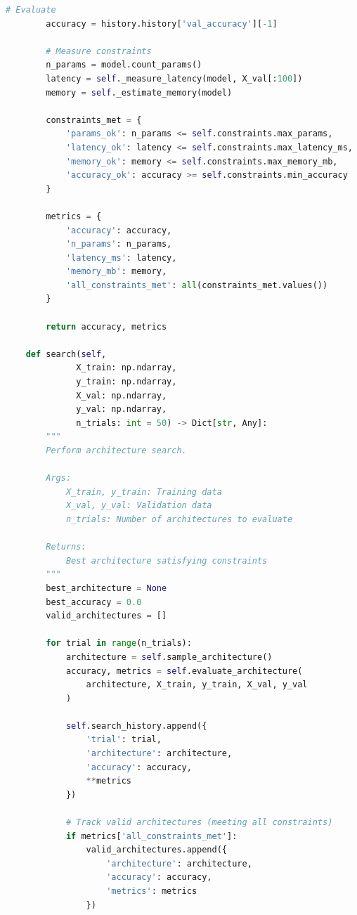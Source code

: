 \begin{lstlisting}[language=Python, caption={NAS with Deployment Constraints}]
        # Evaluate
        accuracy = history.history['val_accuracy'][-1]

        # Measure constraints
        n_params = model.count_params()
        latency = self._measure_latency(model, X_val[:100])
        memory = self._estimate_memory(model)

        constraints_met = {
            'params_ok': n_params <= self.constraints.max_params,
            'latency_ok': latency <= self.constraints.max_latency_ms,
            'memory_ok': memory <= self.constraints.max_memory_mb,
            'accuracy_ok': accuracy >= self.constraints.min_accuracy
        }

        metrics = {
            'accuracy': accuracy,
            'n_params': n_params,
            'latency_ms': latency,
            'memory_mb': memory,
            'all_constraints_met': all(constraints_met.values())
        }

        return accuracy, metrics

    def search(self,
              X_train: np.ndarray,
              y_train: np.ndarray,
              X_val: np.ndarray,
              y_val: np.ndarray,
              n_trials: int = 50) -> Dict[str, Any]:
        """
        Perform architecture search.

        Args:
            X_train, y_train: Training data
            X_val, y_val: Validation data
            n_trials: Number of architectures to evaluate

        Returns:
            Best architecture satisfying constraints
        """
        best_architecture = None
        best_accuracy = 0.0
        valid_architectures = []

        for trial in range(n_trials):
            architecture = self.sample_architecture()
            accuracy, metrics = self.evaluate_architecture(
                architecture, X_train, y_train, X_val, y_val
            )

            self.search_history.append({
                'trial': trial,
                'architecture': architecture,
                'accuracy': accuracy,
                **metrics
            })

            # Track valid architectures (meeting all constraints)
            if metrics['all_constraints_met']:
                valid_architectures.append({
                    'architecture': architecture,
                    'accuracy': accuracy,
                    'metrics': metrics
                })


\end{lstlisting}
